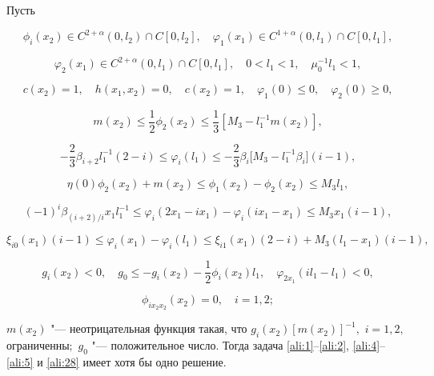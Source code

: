 \begin{theorem}[5]Пусть 

$$\phi_i(x_2)\in C^{2+\alpha}(0,l_2)\cap C[0,l_2], \quad \varphi_1(x_1)\in C^{1+\alpha}(0,l_1)\cap C[0,l_1],$$ 

$$\varphi_2(x_1)\in C^{2+\alpha}(0,l_1)\cap C[0, l_1], \quad 0<l_1<1,\quad \mu_0^{-1}l_1<1,$$ 

$$c(x_2)=1, \quad h(x_1,x_2)=0, \quad c(x_2)=1, \quad \varphi_1(0)\le0, \quad \varphi_2(0)\ge0,$$ 

$$m(x_2)\le\frac{1}{2}\phi_2(x_2)\le\frac{1}{3}[M_3- l_1^{-1} m(x_2)],$$ 

$$-\frac{2}{3}\beta_{i+2}l_1^{-1}(2-i)\le\varphi_i(l_1)\le-\frac{2}{3}\beta_{i} \bigl[ M_3 - l_1^{-1} \beta_i \bigr] (i-1),$$ 

$$\eta(0)\phi_2(x_2)+m(x_2)\le\phi_1(x_2)-\phi_2(x_2)\le M_3l_1,$$ 

$$(-1)^i\beta_{({i+2})/{i}}x_1l_1^{-1}\le\varphi_i(2x_1-ix_1)-\varphi_i(ix_1-x_1)\le M_3x_1(i-1),$$ 

$$\xi_{i0}(x_1)(i-1)\le\varphi_i(x_1)-\varphi_i(l_1)\le\xi_{i1}(x_1)(2-i)+M_3(l_1-x_1)(i-1),$$ 

$$g_i(x_2)<0,\quad g_0\le-g_i(x_2)-\frac{1}{2}\phi_i(x_2)l_1, \quad \varphi_{2x_1}(il_1-l_1)<0,$$ 

$$\phi_{ix_2x_2}(x_2)=0, \quad i=1, 2;$$  

$m(x_2)$ "--- неотрицательная функция такая{\rm ,} что $g_i(x_2)[m(x_2)]^{-1},$ $i=1, 2,$ огра\-ни\-ченны$;$ $g_0$ "--- положительное число{\rm .} Тогда задача {\rm \eqref{ali:1}--\eqref{ali:2}{\rm ,} \eqref{ali:4}--\eqref{ali:5}} и \eqref{ali:28} имеет хотя бы одно решение{\rm .}

\end{theorem} 







